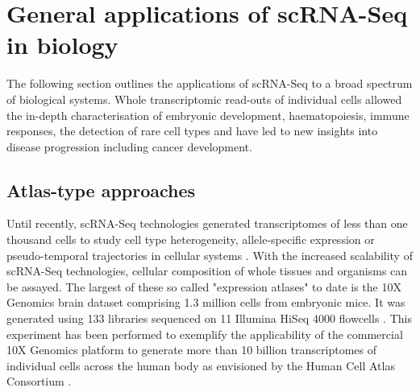 
\section{General applications of scRNA-Seq in biology}

The following section outlines the applications of scRNA-Seq to a broad spectrum of biological systems. 
Whole transcriptomic read-outs of individual cells allowed the in-depth characterisation of embryonic development, haematopoiesis, immune responses, the detection of rare cell types and have led to new insights into disease progression including cancer development. 

\subsection{Atlas-type approaches}

Until recently, scRNA-Seq technologies generated transcriptomes of less than one thousand cells to study cell type heterogeneity, allele-specific expression or pseudo-temporal trajectories in cellular systems \citep{Kolodziejczyk2015review}. 
With the increased scalability of scRNA-Seq technologies, cellular composition of whole tissues and organisms can be assayed. The largest of these so called "expression atlases" to date is the 10X Genomics\textsuperscript{\textregistered}{} brain dataset comprising 1.3 million cells from embryonic mice. 
It was generated using 133 libraries sequenced on 11 Illumina HiSeq\textsuperscript{\textregistered}{} 4000 flowcells \citep{10XGenomics2017}. 
This experiment has been performed to exemplify the applicability of the commercial 10X Genomics platform to generate more than 10 billion transcriptomes of individual cells across the human body as envisioned by the Human Cell Atlas Consortium \citep{Regev2017}.\\

